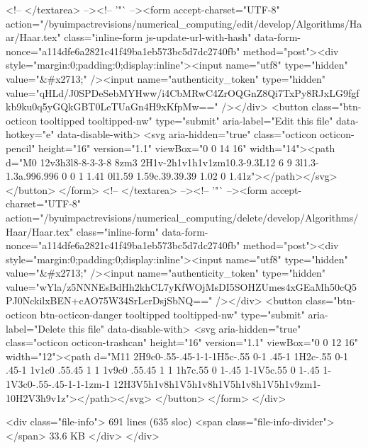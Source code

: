         <!-- </textarea> --><!-- '"` --><form accept-charset="UTF-8" action="/byuimpactrevisions/numerical_computing/edit/develop/Algorithms/Haar/Haar.tex" class="inline-form js-update-url-with-hash" data-form-nonce="a114dfe6a2821c41f49ba1eb573bc5d7dc2740fb" method="post"><div style="margin:0;padding:0;display:inline"><input name="utf8" type="hidden" value="&#x2713;" /><input name="authenticity_token" type="hidden" value="qHLd/J0SPDeSebMYHww/i4CbMRwC4ZrOQGnZ8Qi7TxPy8RJxLG9fgfkb9ku0q5yGQkGBT0LeTUaGn4H9xKfpMw==" /></div>
          <button class="btn-octicon tooltipped tooltipped-nw" type="submit"
            aria-label="Edit this file" data-hotkey="e" data-disable-with>
            <svg aria-hidden="true" class="octicon octicon-pencil" height="16" version="1.1" viewBox="0 0 14 16" width="14"><path d="M0 12v3h3l8-8-3-3-8 8zm3 2H1v-2h1v1h1v1zm10.3-9.3L12 6 9 3l1.3-1.3a.996.996 0 0 1 1.41 0l1.59 1.59c.39.39.39 1.02 0 1.41z"></path></svg>
          </button>
</form>        <!-- </textarea> --><!-- '"` --><form accept-charset="UTF-8" action="/byuimpactrevisions/numerical_computing/delete/develop/Algorithms/Haar/Haar.tex" class="inline-form" data-form-nonce="a114dfe6a2821c41f49ba1eb573bc5d7dc2740fb" method="post"><div style="margin:0;padding:0;display:inline"><input name="utf8" type="hidden" value="&#x2713;" /><input name="authenticity_token" type="hidden" value="wYla/z5NNNEsBdHh2khCL7yKfWOjMsDI5SOHZUmes4xGEaMh50cQ5PJ0NckilxBEN+cAO75W34SrLerDsjSbNQ==" /></div>
          <button class="btn-octicon btn-octicon-danger tooltipped tooltipped-nw" type="submit"
            aria-label="Delete this file" data-disable-with>
            <svg aria-hidden="true" class="octicon octicon-trashcan" height="16" version="1.1" viewBox="0 0 12 16" width="12"><path d="M11 2H9c0-.55-.45-1-1-1H5c-.55 0-1 .45-1 1H2c-.55 0-1 .45-1 1v1c0 .55.45 1 1 1v9c0 .55.45 1 1 1h7c.55 0 1-.45 1-1V5c.55 0 1-.45 1-1V3c0-.55-.45-1-1-1zm-1 12H3V5h1v8h1V5h1v8h1V5h1v8h1V5h1v9zm1-10H2V3h9v1z"></path></svg>
          </button>
</form>  </div>

  <div class="file-info">
      691 lines (635 sloc)
      <span class="file-info-divider"></span>
    33.6 KB
  </div>
</div>

  

